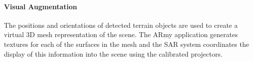 \documentclass[10pt,twocolumn,letterpaper]{article}
\begin{document}
\vspace{-0.15in}
\paragraph{Visual Augmentation }



The positions and orientations of detected terrain objects are used to
create a virtual 3D mesh representation of the scene.  The ARmy
application generates textures for each of the surfaces in the mesh
and the SAR system coordinates the display of this information into
the scene using the calibrated projectors.

\end{document}
